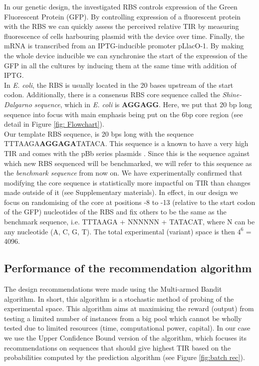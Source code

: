 \documentclass{article}
\begin{document}
In our genetic design, the investigated RBS controls expression of the Green Fluorescent Protein (GFP). 
By controlling expression of a fluorescent protein with the RBS we can quickly assess the perceived relative TIR by measuring fluorescence of cells harbouring plasmid with the device over time.
Finally, the mRNA is transcribed from an IPTG-inducible promoter pLlacO-1. 
By making the whole device inducible we can synchronise the start of the expression of the GFP in all the cultures by inducing them at the same time with addition of IPTG.\\

In \emph{E. coli}, the RBS is usually located in the 20 bases upstream of the start codon. 
Additionally, there is a consensus RBS core sequence called the \textit{Shine-Dalgarno sequence}, which in \emph{E. coli} is \textbf{AGGAGG}. 
Here, we put that 20 bp long sequence into focus with main emphasis being put on the 6bp core region
(see detail in Figure \ref{fig: Flowchart}).\\

Our template RBS sequence, is 20 bps long with the sequence TTTAAGA\textbf{AGGAGA}TATACA.
This sequence is a known to have a very high TIR and comes with the pBb series plasmids \cite{Lee2011}. 
Since this is the sequence against which new RBS sequenced will be benchmarked,
we will refer to this sequence as the \textit{benchmark sequence} from now on.
We have experimentally confirmed that modifying the core sequence is statistically more impactful on TIR than changes made outside of it (see Supplementary materials).
In effect, in our design we focus on randomising of the core at positions -8 to -13 (relative to the start codon of the GFP) nucleotides of the RBS and fix others to be the same as the benchmark sequence, i.e. TTTAAGA + NNNNNN + TATACAT, where N can be any nucleotide (A, C, G, T). 
The total experimental (variant) space is then $4^6$ = 4096.

\subsection{Performance of the recommendation algorithm}
 
The design recommendations were made using the Multi-armed Bandit algorithm.
In short, this algorithm is a stochastic method of probing of the experimental space. 
This algorithm aims at maximising the reward (output) from testing a limited number of instances from a big pool which cannot be wholly tested due to limited resources (time, computational power, capital). 
In our case we use the Upper Confidence Bound version of the algorithm, which focuses its recommendations on sequences that should give highest TIR based on the probabilities computed by the prediction algorithm (see Figure \ref{fig:batch rec}).\\ 
\end{document}
